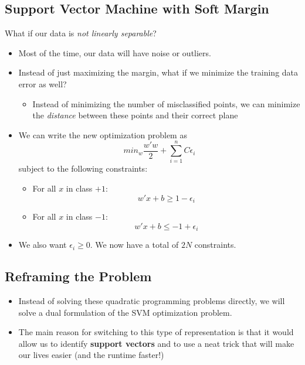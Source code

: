 \documentclass[10pt]{article}
\begin{document}
\subsection*{Support Vector Machine with Soft Margin}
What if our data is \textit{not linearly separable}?
\begin{itemize}
	\item Most of the time, our data will have noise or outliers.
	\item Instead of just maximizing the margin, what if we minimize the training data error as well?
	\begin{itemize}
	    \item Instead of minimizing the number of misclassified points, we can minimize the \textit{distance} between these points and their correct plane
    \end{itemize}
    \item We can write the new optimization problem as
    \[min_w \frac{w' w}{2} + \sum_{i = 1}^n C \epsilon_i\]
    subject to the following constraints:
    \begin{itemize}
	    \item For all $x$ in class $+1$:
	    \[w'x + b \geq 1 - \epsilon_i\]
        \item For all $x$ in class $-1$:
        \[w'x + b \leq -1 + \epsilon_i\]
    \end{itemize}
    \item We also want $\epsilon_i \geq 0$.  We now have a total of $2N$ constraints.
\end{itemize}

\subsection*{Reframing the Problem}
\begin{itemize}
	\item Instead of solving these quadratic programming problems directly, we will solve a dual formulation of the SVM optimization problem.
	\item The main reason for switching to this type of representation is that it would allow us to identify \textbf{support vectors} and to use a neat trick that will make our lives easier (and the runtime faster!)
\end{itemize}
\end{document}
